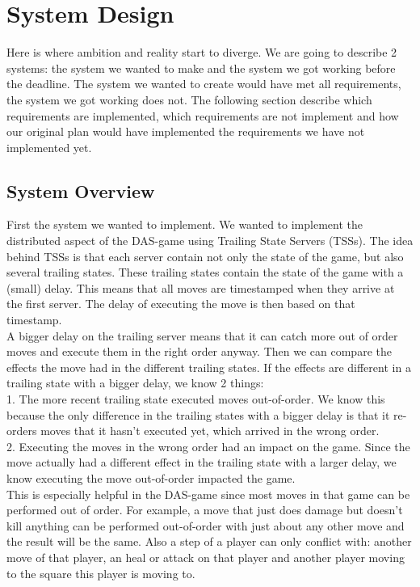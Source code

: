 \section{System Design}
\label{chap:sysdesign}
Here is where ambition and reality start to diverge. We are going to describe 2 systems: the system we wanted to make and the system we got working before the deadline. The system we wanted to create would have met all requirements, the system we got working does not. The following section describe which requirements are implemented, which requirements are not implement and how our original plan would have implemented the requirements we have not implemented yet.

\subsection{System Overview}
First the system we wanted to implement. We wanted to implement the distributed aspect of the DAS-game using Trailing State Servers (TSSs). The idea behind TSSs is that each server contain not only the state of the game, but also several trailing states. These trailing states contain the state of the game with a (small) delay. This means that all moves are timestamped when they arrive at the first server. The delay of executing the move is then based on that timestamp.\\
A bigger delay on the trailing server means that it can catch more out of order moves and execute them in the right order anyway. Then we can compare the effects the move had in the different trailing states. If the effects are different in a trailing state with a bigger delay, we know 2 things:\\
1. The more recent trailing state executed moves out-of-order. We know this because the only difference in the trailing states with a bigger delay is that it re-orders moves that it hasn't executed yet, which arrived in the wrong order. \\
2. Executing the moves in the wrong order had an impact on the game. Since the move actually had a different effect in the trailing state with a larger delay, we know executing the move out-of-order impacted the game.\\
This is especially helpful in the DAS-game since most moves in that game can be performed out of order. For example, a move that just does damage but doesn't kill anything can be performed out-of-order with just about any other move and the result will be the same. Also a step of a player can only conflict with: another move of that player, an heal or attack on that player and another player moving to the square this player is moving to.\\
